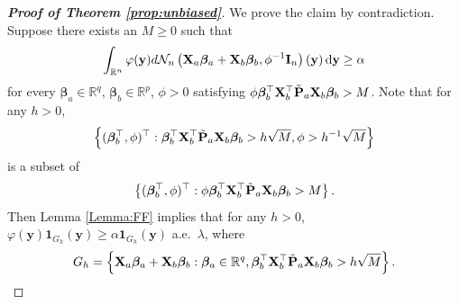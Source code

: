 \documentclass[smallextended]{svjour3}       %
\newcommand{\By}{\mathbf{y}}    \newcommand{\Bz}{\mathbf{z}}
\newcommand{\bfsym}[1]{\ensuremath{\boldsymbol{#1}}}
\def\bbeta{\bfsym \beta}
\begin{document}
\begin{proof}[\textbf{Proof of Theorem \ref{prop:unbiased}}]
    We prove the claim by contradiction.
    Suppose there exists an $M\geq 0$ such that
    \begin{equation*}
        \int_{\mathbb R^n} \varphi(\By) d\mathcal N_n \left(\BX_a \bbeta_a + \BX_b \bbeta_b,\phi^{-1} \BI_n\right) (\By)\, \mathrm{d}\By 
        \geq \alpha 
    \end{equation*}
    for every $\bbeta_a\in \mathbb R^q$, $\bbeta_b \in \mathbb R^p$, $\phi>0$ satisfying $\phi \bbeta_b^\top \BX_b^\top \tilde \BP_a \BX_b \bbeta_b >M$.
    Note that for any $h>0$,
    \begin{equation*}
        \left\{(\bbeta_b^\top, \phi)^\top :  \bbeta_b^\top \BX_b^\top \tilde\BP_a \BX_b \bbeta_b > h \sqrt M,\phi> h^{-1} \sqrt M \right\} 
    \end{equation*}
    is a subset of
    \begin{equation*}
        \left\{(\bbeta_b^\top, \phi)^\top :  \phi\bbeta_b^\top \BX_b^\top \tilde\BP_a \BX_b \bbeta_b > M\right\} .
    \end{equation*}
    Then Lemma \ref{Lemma:FF} implies that for any $h>0$, $\varphi(\By) \mathbf 1_{G_h}(\By)\geq \alpha \mathbf 1_{G_h}(\By)$ a.e.\ $\lambda$, where 
    \begin{equation*}
        G_h=\left\{ \BX_a \bbeta_a + \BX_b \bbeta_b:  \bbeta_a \in \mathbb R^{q},
        \bbeta_b^\top \BX_b^\top \tilde \BP_a \BX_b \bbeta_b > h \sqrt M
    \right\}.
    \end{equation*}

\end{proof}
\end{document}
